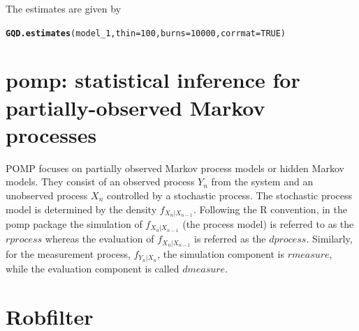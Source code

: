 \documentclass[a4paper,11pt]{article}\usepackage[]{graphicx}\usepackage[]{color}
\makeatletter
\newcommand{\hlnum}[1]{\textcolor[rgb]{0.686,0.059,0.569}{#1}}%
\newcommand{\hlstd}[1]{\textcolor[rgb]{0.345,0.345,0.345}{#1}}%
\newcommand{\hlkwc}[1]{\textcolor[rgb]{0.333,0.667,0.333}{#1}}%
\newcommand{\hlkwd}[1]{\textcolor[rgb]{0.737,0.353,0.396}{\textbf{#1}}}%
\newenvironment{kframe}{%
 \def\at@end@of@kframe{}%
 \ifinner\ifhmode%
  \def\at@end@of@kframe{\end{minipage}}%
  \begin{minipage}{\columnwidth}%
 \fi\fi%
 \def\FrameCommand##1{\hskip\@totalleftmargin \hskip-\fboxsep
 \colorbox{shadecolor}{##1}\hskip-\fboxsep
     \hskip-\linewidth \hskip-\@totalleftmargin \hskip\columnwidth}%
 \MakeFramed {\advance\hsize-\width
   \@totalleftmargin\z@ \linewidth\hsize
   \@setminipage}}%
 {\par\unskip\endMakeFramed%
 \at@end@of@kframe}
\newenvironment{knitrout}{}{} %
\makeatother
\begin{document}


The estimates are given by

\begin{knitrout}
\color{fgcolor}\begin{kframe}
\begin{alltt}
\hlkwd{GQD.estimates}\hlstd{(model_1,} \hlkwc{thin} \hlstd{=} \hlnum{100}\hlstd{,} \hlkwc{burns} \hlstd{=} \hlnum{10000}\hlstd{,} \hlkwc{corrmat} \hlstd{=} \hlnum{TRUE}\hlstd{)}
\end{alltt}
\end{kframe}
\end{knitrout}




\section{pomp: statistical inference for partially-observed Markov processes}
POMP focuses on partially observed Markov process models or hidden Markov models. They consist of an observed process $Y_n$ from the system and an unobserved process $X_n$ controlled by a stochastic process. The stochastic process model is determined by the density $f_{X_n | X_{n-1}}$. Following the R convention, in the pomp package the simulation of $f_{X_n|X_{n-1}}$ (the process model) is referred to as the $\textit{rprocess}$ whereas the evaluation of $f_{X_n|X_{n-1}}$ is referred as the $\textit{dprocess}$. Similarly, for the measurement process, $f_{Y_n|X_n}$, the simulation component is $\textit{rmeasure}$, while the evaluation component is called $\textit{dmeasure}$.


\section{Robfilter}
\end{document}
